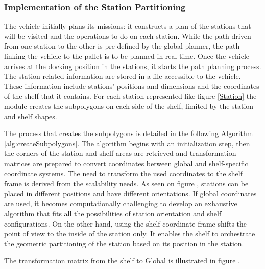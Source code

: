 \subsubsection{Implementation of the Station Partitioning}
The vehicle initially plans its missions: it constructs a plan of the stations that will be visited and the operations
to do on each station. While the path driven from one station to the other is pre-defined by the global planner, 
the path linking the vehicle to the pallet is to be planned in real-time. 
Once the vehicle arrives at the docking position in the stations, it starts the path planning process. 
The station-related information are stored in a file accessible to the vehicle. These information include stations' 
positions and dimensions and the coordinates of the shelf that it contains.
For each station represented like figure \ref{Station} the module creates the subpolygons on each side of the shelf, 
limited by the station and shelf shapes. 

The process that creates the subpolygons is detailed in the following Algorithm \ref{alg:createSubpolygons}.
The algorithm begins with an initialization step, then the corners of the station and shelf areas are retrieved and 
transformation matrices are prepared to convert coordinates between global and shelf-specific coordinate systems. 
The need to transform the used coordinates to the shelf frame is derived from the scalability needs.
As seen on figure , stations can be placed in different positions and have different orientations.
If global coordinates are used, it becomes computationally challenging to develop an exhaustive algorithm that fits all the 
possibilities of station orientation and shelf configurations. On the other hand, using the shelf coordinate frame shifts 
the point of view to the inside of the station only. It enables the shelf to orchestrate the geometric partitioning 
of the station based on its position in the station.

The transformation matrix from the shelf to Global is illustrated in figure .

